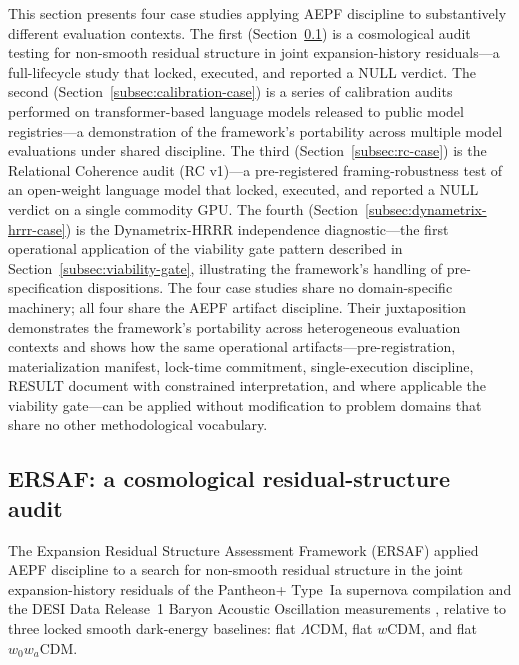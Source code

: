 \documentclass[11pt]{article}
\newcommand{\LCDM}{$\Lambda$CDM}
\newcommand{\wCDM}{$w$CDM}
\newcommand{\wowaCDM}{$w_0 w_a$CDM}
\begin{document}
This section presents four case studies applying AEPF discipline
to substantively different evaluation contexts. The first
(Section~\ref{subsec:ersaf-case}) is a cosmological audit testing
for non-smooth residual structure in joint expansion-history
residuals---a full-lifecycle study that locked, executed, and
reported a NULL verdict. The second
(Section~\ref{subsec:calibration-case}) is a series of calibration
audits performed on transformer-based language models released to
public model registries---a demonstration of the framework's
portability across multiple model evaluations under shared
discipline. The third
(Section~\ref{subsec:rc-case}) is the Relational Coherence audit
(RC v1)---a pre-registered framing-robustness test of an open-weight
language model that locked, executed, and reported a NULL verdict on
a single commodity GPU. The fourth
(Section~\ref{subsec:dynametrix-hrrr-case}) is the
Dynametrix-HRRR independence diagnostic---the first operational
application of the viability gate pattern described in
Section~\ref{subsec:viability-gate}, illustrating the framework's
handling of pre-specification dispositions. The four case studies
share no domain-specific machinery; all four share the AEPF
artifact discipline. Their juxtaposition demonstrates the
framework's portability across heterogeneous evaluation contexts
and shows how the same operational artifacts---pre-registration,
materialization manifest, lock-time commitment, single-execution
discipline, RESULT document with constrained interpretation, and
where applicable the viability gate---can be applied without
modification to problem domains that share no other methodological
vocabulary.

\subsection{ERSAF: a cosmological residual-structure audit}
\label{subsec:ersaf-case}

The Expansion Residual Structure Assessment Framework (ERSAF)
\cite{dixon2026ersaf} applied AEPF discipline to a search for
non-smooth residual structure in the joint expansion-history
residuals of the Pantheon+ Type~Ia supernova compilation
\cite{brout2022pantheon} and the DESI Data Release~1 Baryon Acoustic
Oscillation measurements \cite{adame2024desi3, adame2024desi4},
relative to three locked smooth dark-energy baselines: flat \LCDM{},
flat \wCDM{}, and flat \wowaCDM{}.
\end{document}
